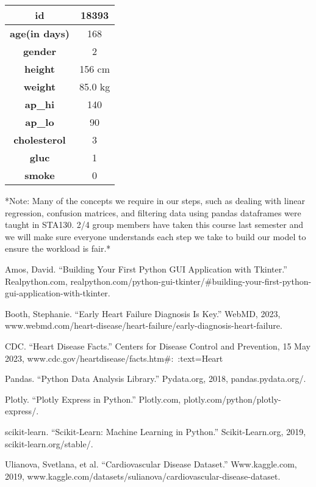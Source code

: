 \documentclass[fontsize=11pt]{article}
\begin{document}
\newline
\begin{table}[ht]
\centering
\begin{tabular}{|c|c|}
\hline
\textbf{id} & \textbf{18393} \\
\hline
\textbf{age(in days)} & 168 \\
\hline
\textbf{gender} & 2 \\
\hline
\textbf{height} & 156 cm \\
\hline
\textbf{weight} & 85.0 kg \\
\hline
\textbf{ap\_hi} & 140 \\
\hline
\textbf{ap\_lo} & 90 \\
\hline
\textbf{cholesterol} & 3 \\
\hline
\textbf{gluc} & 1 \\
\hline
\textbf{smoke} & 0 \\
\hline
\end{tabular}
\end{table}
\newline
\newline
*Note: Many of the concepts we require in our steps, such as dealing with linear regression, confusion matrices, and filtering data using pandas dataframes were taught in STA130. 2/4 group members have taken this course last semester and we will make sure everyone understands each step we take to build our model to ensure the workload is fair.*

\begin{thebibliography}{9}

Amos, David. “Building Your First Python GUI Application with Tkinter.” Realpython.com, realpython.com/python-gui-tkinter/#building-your-first-python-gui-application-with-tkinter.

Booth, Stephanie. “Early Heart Failure Diagnosis Is Key.” WebMD, 2023, www.webmd.com/heart-disease/heart-failure/early-diagnosis-heart-failure.

CDC. “Heart Disease Facts.” Centers for Disease Control and Prevention, 15 May 2023, www.cdc.gov/heartdisease/facts.htm#:~:text=Heart%

Pandas. “Python Data Analysis Library.” Pydata.org, 2018, pandas.pydata.org/.

Plotly. “Plotly Express in Python.” Plotly.com, plotly.com/python/plotly-express/.

scikit-learn. “Scikit-Learn: Machine Learning in Python.” Scikit-Learn.org, 2019, scikit-learn.org/stable/.

Ulianova, Svetlana, et al. “Cardiovascular Disease Dataset.” Www.kaggle.com, 2019, www.kaggle.com/datasets/sulianova/cardiovascular-disease-dataset.

\end{thebibliography}
\end{document}
